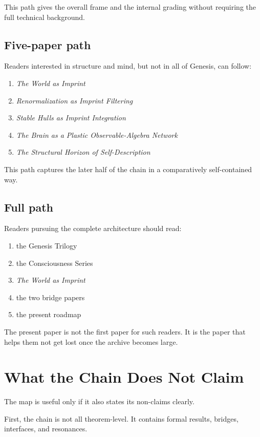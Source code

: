 \documentclass[12pt]{article}
\begin{document}
This path gives the overall frame and the internal grading without requiring the full technical background.

\subsection{Five-paper path}

Readers interested in structure and mind, but not in all of Genesis, can follow:

\begin{enumerate}
\item \emph{The World as Imprint}
\item \emph{Renormalization as Imprint Filtering}
\item \emph{Stable Hulls as Imprint Integration}
\item \emph{The Brain as a Plastic Observable-Algebra Network}
\item \emph{The Structural Horizon of Self-Description}
\end{enumerate}

This path captures the later half of the chain in a comparatively self-contained way.

\subsection{Full path}

Readers pursuing the complete architecture should read:

\begin{enumerate}
\item the Genesis Trilogy
\item the Consciousness Series
\item \emph{The World as Imprint}
\item the two bridge papers
\item the present roadmap
\end{enumerate}

The present paper is not the first paper for such readers. It is the paper that helps them not get lost once the archive becomes large.

\section{What the Chain Does Not Claim}

The map is useful only if it also states its non-claims clearly.

First, the chain is not all theorem-level. It contains formal results, bridges, interfaces, and resonances.
\end{document}
